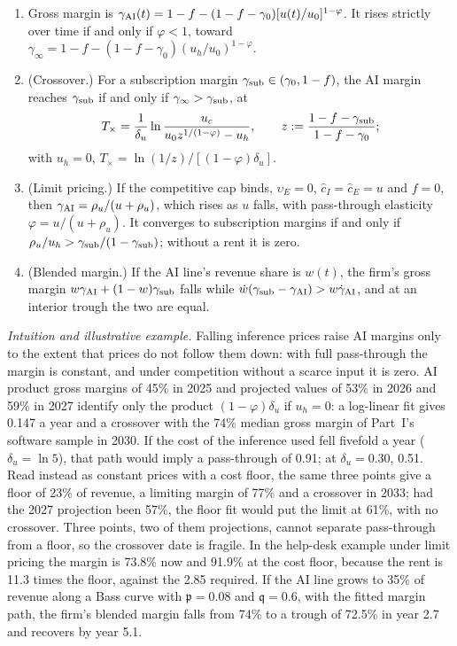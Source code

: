 \begin{proposition}\label{prop:prod-margin}
\begin{enumerate}
\item[(a)] Gross margin is $\gamma_{\rm AI}(t)=1-f-(1-f-\gamma_0)[u(t)/u_0]^{1-\varphi}$. It rises strictly over time if and only if $\varphi<1$, toward $\gamma_\infty=1-f-(1-f-\gamma_0)(u_h/u_0)^{1-\varphi}$.
\item[(b)] (Crossover.) For a subscription margin $\gamma_{\rm sub}\in(\gamma_0,1-f)$, the AI margin reaches $\gamma_{\rm sub}$ if and only if $\gamma_\infty>\gamma_{\rm sub}$, at
\begin{equation}\label{eq:prod-Tx}
T_\times=\frac1{\delta_u}\ln\frac{u_c}{u_0z^{1/(1-\varphi)}-u_h},\qquad z:=\frac{1-f-\gamma_{\rm sub}}{1-f-\gamma_0};
\end{equation}
with $u_h=0$, $T_\times=\ln(1/z)/[(1-\varphi)\delta_u]$.
\item[(c)] (Limit pricing.) If the competitive cap binds, $\upsilon_E=0$, $\hat c_I=\hat c_E=u$ and $f=0$, then $\gamma_{\rm AI}=\rho_u/(u+\rho_u)$, which rises as $u$ falls, with pass-through elasticity $\varphi=u/(u+\rho_u)$. It converges to subscription margins if and only if $\rho_u/u_h>\gamma_{\rm sub}/(1-\gamma_{\rm sub})$; without a rent it is zero.
\item[(d)] (Blended margin.) If the AI line's revenue share is $w(t)$, the firm's gross margin $w\gamma_{\rm AI}+(1-w)\gamma_{\rm sub}$ falls while $\dot w(\gamma_{\rm sub}-\gamma_{\rm AI})>w\dot\gamma_{\rm AI}$, and at an interior trough the two are equal.
\end{enumerate}
\end{proposition}

\noindent\emph{Intuition and illustrative example.} Falling inference prices raise AI margins only to the extent that prices do not follow them down: with full pass-through the margin is constant, and under competition without a scarce input it is zero. AI product gross margins of 45\% in 2025 and projected values of 53\% in 2026 and 59\% in 2027 \citep{iconiq2026state} identify only the product $(1-\varphi)\delta_u$ if $u_h=0$: a log-linear fit gives 0.147 a year and a crossover with the 74\% median gross margin of Part~I's software sample in 2030. If the cost of the inference used fell fivefold a year ($\delta_u=\ln 5$), that path would imply a pass-through of 0.91; at $\delta_u=0.30$, 0.51. Read instead as constant prices with a cost floor, the same three points give a floor of 23\% of revenue, a limiting margin of 77\% and a crossover in 2033; had the 2027 projection been 57\%, the floor fit would put the limit at 61\%, with no crossover. Three points, two of them projections, cannot separate pass-through from a floor, so the crossover date is fragile. In the help-desk example under limit pricing the margin is 73.8\% now and 91.9\% at the cost floor, because the rent is 11.3 times the floor, against the 2.85 required. If the AI line grows to 35\% of revenue along a Bass curve with $\mathfrak p=0.08$ and $\mathfrak q=0.6$, with the fitted margin path, the firm's blended margin falls from 74\% to a trough of 72.5\% in year 2.7 and recovers by year 5.1.

